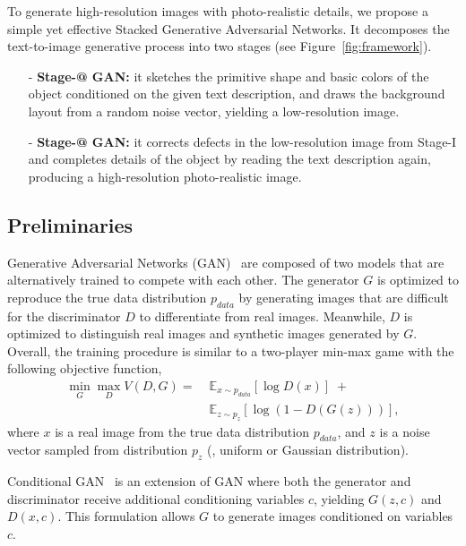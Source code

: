 \documentclass[10pt,twocolumn,letterpaper]{article}
\makeatletter
\newcommand{\Rmnum}[1]{\expandafter\@slowromancap\romannumeral #1@}
\makeatother
\begin{document}
To generate high-resolution images with photo-realistic details, we propose a simple yet effective Stacked Generative Adversarial Networks. It decomposes the text-to-image generative process into two stages (see Figure~\ref{fig:framework}).  
\vspace{-5pt}
\begin{enumerate}
\item [-] \textbf{Stage-\Rmnum{1} GAN:} it sketches the primitive shape and basic colors of the object conditioned on the given text description, and draws the background layout from a random noise vector, yielding a low-resolution image. 
\vspace{-10pt}
\item [-] \textbf{Stage-\Rmnum{2} GAN:} it corrects defects in the low-resolution image from Stage-I and completes details of the object by reading the text description again, producing a high-resolution photo-realistic image. 
\end{enumerate}
\vspace{-5pt}

\subsection{Preliminaries}
\vspace{-5pt}
Generative Adversarial Networks (GAN)~\cite{goodfellow2014generative} are composed of two models that are alternatively trained to compete with each other. The generator $G$ is optimized to reproduce the true data distribution $p_{data}$ by generating images that are difficult for the discriminator $D$ to differentiate from real images. Meanwhile, $D$ is optimized to distinguish real images and synthetic images generated by $G$. Overall, the training procedure is similar to a two-player min-max game with the following objective function, 
\begin{equation}\label{eq:GAN_ori}
\begin{aligned}
\min_{G} \max_{D} V(D,G) = \; & \mathbb{E}_{x \sim {p_{data}}} [\log D(x)] \; + \\
& \mathbb{E}_{z \sim {p_{z}}} [\log(1 - D(G(z)))],
\end{aligned}
\end{equation}
where $x$ is a real image from the true data distribution $p_{data}$, and $z$ is a noise vector sampled from distribution $p_{z}$ (\eg, uniform or Gaussian distribution). 

Conditional GAN~\cite{gauthier2015conditional, Mirza14} is an extension of GAN where both the generator and discriminator receive additional conditioning variables $c$, yielding $G(z,c)$ and $D(x,c)$. This formulation allows $G$ to generate images conditioned on variables $c$. 
\end{document}
